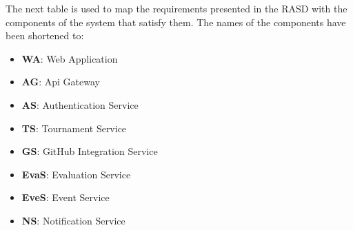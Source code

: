 The next table is used to map the requirements presented in the RASD with the components of the system that satisfy them. The names of the components have been shortened to:
\begin{itemize}
    \item \textbf{WA}: Web Application
    \item \textbf{AG}: Api Gateway
    \item \textbf{AS}: Authentication Service
    \item \textbf{TS}: Tournament Service
    \item \textbf{GS}: GitHub Integration Service
    \item \textbf{EvaS}: Evaluation Service
    \item \textbf{EveS}: Event Service
    \item \textbf{NS}: Notification Service
\end{itemize}


